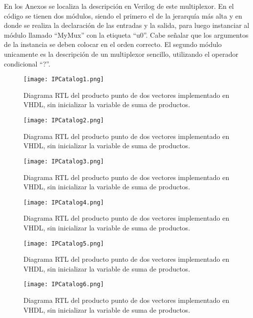 En los Anexos se localiza la descripción en Verilog de este multiplexor. En el código se tienen dos módulos, siendo el primero el de la jerarquía más alta y en donde se realiza la declaración de las entradas y la salida, para luego instanciar al módulo llamado ``MyMux'' con la etiqueta ``u0''. Cabe señalar que los argumentos de la instancia se deben colocar en el orden correcto. El segundo módulo unicamente es la descripción de un multiplexor sencillo, utilizando el operador condicional ``?''.

\begin{figure}[ht]
	\centering
	\texttt{[image: IPCatalog1.png]}
	\caption{Diagrama RTL del producto punto de dos vectores implementado en VHDL, sin inicializar la variable de suma de productos. \label{fig:ipcatalog1}}
\end{figure}

\begin{figure}[ht]
	\centering
	\texttt{[image: IPCatalog2.png]}
	\caption{Diagrama RTL del producto punto de dos vectores implementado en VHDL, sin inicializar la variable de suma de productos. \label{fig:ipcatalog2}}
\end{figure}

\begin{figure}[ht]
	\centering
	\texttt{[image: IPCatalog3.png]}
	\caption{Diagrama RTL del producto punto de dos vectores implementado en VHDL, sin inicializar la variable de suma de productos. \label{fig:ipcatalog3}}
\end{figure}

\begin{figure}[ht]
	\centering
	\texttt{[image: IPCatalog4.png]}
	\caption{Diagrama RTL del producto punto de dos vectores implementado en VHDL, sin inicializar la variable de suma de productos. \label{fig:ipcatalog4}}
\end{figure}

\begin{figure}[ht]
	\centering
	\texttt{[image: IPCatalog5.png]}
	\caption{Diagrama RTL del producto punto de dos vectores implementado en VHDL, sin inicializar la variable de suma de productos. \label{fig:ipcatalog5}}
\end{figure}

\begin{figure}[ht]
	\centering
	\texttt{[image: IPCatalog6.png]}
	\caption{Diagrama RTL del producto punto de dos vectores implementado en VHDL, sin inicializar la variable de suma de productos. \label{fig:ipcatalog6}}
\end{figure}


